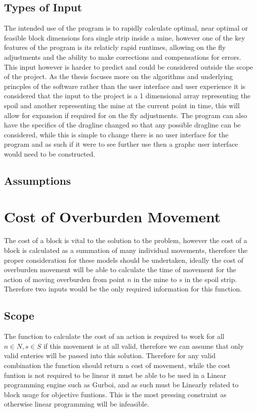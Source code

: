 \subsection{Types of Input}
The intended use of the program is to rapidly calculate optimal, near optimal or feasible block dimensions fora single strip inside a mine, however one of the key features of the program is its relaticly rapid runtimes, allowing on the fly adjustments and the ability to make corrections and compensations for errors. This input however is harder to predict and could be considered outside the scope of the project. As the thesis focuses more on the algorithms and underlying princples of the software rather than the user interface and user experience it is considered that the input to the project is a 1 dimensional array representing the spoil and another representing the mine at the current point in time, this will allow for expansion if required for on the fly adjustments. The program can also have the specifics of the dragline changed so that any possible dragline can be considered, while this is simple to change there is no user interface for the program and as such if it were to see further use then a graphc user interface would need to be constructed. \\

\subsection{Assumptions}

\section{Cost of Overburden Movement}
The cost of a block is vital to the solution to the problem, however the cost of a block is calculated as a summation of many individual movements, therefore the proper consideration for these models should be undertaken, ideally the cost of overburden movement will be able to calculate the time of movement for the action of moving overburden from point $n$ in the mine to $s$ in the spoil strip. Therefore two inputs would be the only required information for this function.
\subsection{Scope}
The function to calculate the cost of an action is required to work for all $n\in N , s \in S$ if this movement is at all valid, therefore we can assume that only valid enteries will be passed into this solution. Therefore for any valid combination the function should return a cost of movement, while the cost funtion is not required to be linear it must be able to be used in a Linear programming engine such as Gurboi, and as such must be Linearly related to block usage for objective funtions. This is the most pressing constraint as otherwise linear programming will be infeasible.

